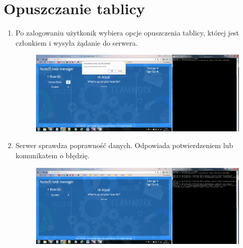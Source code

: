 \documentclass[12pt]{report}
\begin{document}
\section{Opuszczanie tablicy}
\begin{enumerate}
\item Po zalogowaniu użytkonik wybiera opcje opuszczenia tablicy, której jest członkiem i wysyła żądanie do serwera.
\begin{figure}[!hb]
\centering
\includegraphics[width=\textwidth,height=\textheight,keepaspectratio]{D1.png}
\end{figure}
\item Serwer sprawdza poprawność danych. Odpowiada potwierdzeniem lub komunikatem o błędzię.
\begin{figure}[!hb]
\centering
\includegraphics[width=\textwidth,height=\textheight,keepaspectratio]{D2.png}
\end{figure}
\end{enumerate}
\end{document}
